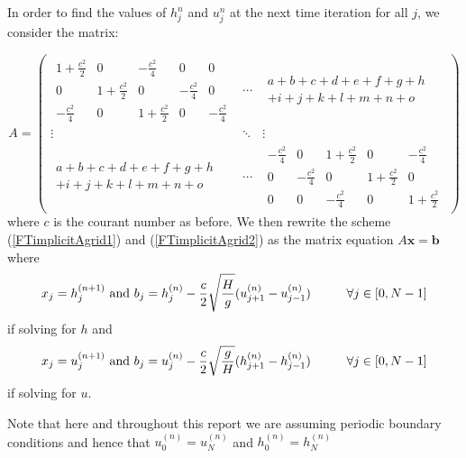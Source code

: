 \documentclass[a4paper,12pt, notitlepage]{report}
\newcommand\tab[1][0.05cm]{\hspace*{#1}}
\begin{document}
In order to find the values of $h_{j}^{n}$ and $u_{j}^{n}$ at the next time iteration for all $j$, we consider the matrix:

\[
A = \left (
\begin{array}{ccc}
\begin{array}{ccccc}
1 + \frac{c^{2}}{2} & 0 & -\frac{c^{2}}{4} & 0 & 0\\
0 & 1 + \frac{c^{2}}{2} & 0 & -\frac{c^{2}}{4} & 0\\
-\frac{c^{2}}{4}& 0 & 1 + \frac{c^{2}}{2} & 0 & -\frac{c^{2}}{4} 
\end{array}
& \cdots & 
\begin{array}{l}
a+b+c+d+e+f+g+h\\
+i+j+k+l+m+n+o 
\end{array} \\
\vdots & \ddots & \vdots\\
\begin{array}{l}
a+b+c+d+e+f+g+h\\
+i+j+k+l+m+n+o 
\end{array} &
\cdots & 
\begin{array}{ccccc}
-\frac{c^{2}}{4}& 0 & 1 + \frac{c^{2}}{2} & 0 & -\frac{c^{2}}{4} \\
0 & -\frac{c^{2}}{4} & 0 & 1 + \frac{c^{2}}{2} & 0\\
0 & 0 & -\frac{c^{2}}{4}& 0 & 1 + \frac{c^{2}}{2}
\end{array}
\end{array}
\right )
\]
where $c$ is the courant number as before. We then rewrite the scheme (\ref{FTimplicitAgrid1}) and (\ref{FTimplicitAgrid2}) as the matrix equation $A \mathbf{x} = \mathbf{b}$ where 
\begin{equation}
x_{j} = h_{j}^{(n+1)} \text { and } b_{j} = h_{j}^{(n)} - \frac{c}{2}\sqrt{\frac{H}{g}}(u_{j+1}^{(n)} - u_{j-1}^{(n)})  \tab[1cm] \forall j \in [0, N-1]
\end{equation}
if solving for $h$ and
\begin{equation}
x_{j} = u_{j}^{(n+1)} \text { and } b_{j} = u_{j}^{(n)} - \frac{c}{2}\sqrt{\frac{g}{H}}(h_{j+1}^{(n)} - h_{j-1}^{(n)})  \tab[1cm] \forall j \in [0, N-1]
\end{equation}
if solving for $u$.

Note that here and throughout this report we are assuming periodic boundary conditions and hence that $u_{0}^{(n)} = u_{N}^{(n)}$ and $h_{0}^{(n)} = h_{N}^{(n)}$
\end{document}
